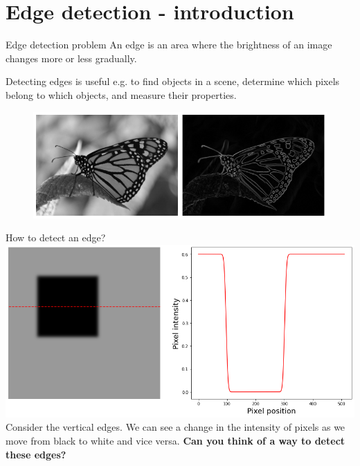 \documentclass[9pt, aspectratio=169]{beamer}
\begin{document}
\begin{frame}
\begin{columns}
\begin{column}{0.2\textwidth}
        \end{column}
    \end{columns}
\end{frame}

\section{Edge detection - introduction}

\begin{frame}
    {Edge detection problem}
    An edge is an area where the brightness of an image changes more or less gradually.

    Detecting edges is useful e.g. to find objects in a scene, determine which pixels belong to which objects, and measure their properties.
    \begin{figure}
        \includegraphics[width=\textwidth]{monarch_sobel.png}
        \caption{\footnotesize{\color{gray}{Monarch butterfly - CC-BY-SA 2.0 Ted @ Flickr}\color{black}}}
    \end{figure}
\end{frame}

\begin{frame}
    {How to detect an edge?}
    \includegraphics[width=\textwidth]{line_intensity.png}
    Consider the vertical edges. We can see a change in the intensity of pixels as we move from black to white and vice versa. \textbf{Can you think of a way to detect these edges?}
\end{frame}
\end{document}
